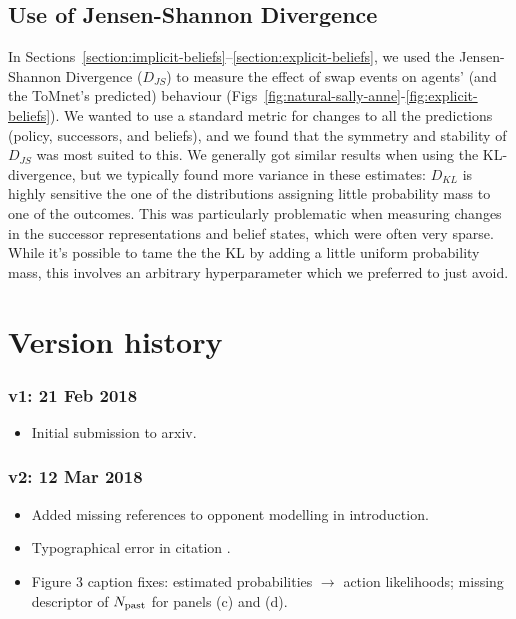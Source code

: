 \documentclass{article}
\begin{document}
\subsection{Use of Jensen-Shannon Divergence}
\label{appendix:notes:JS}

In Sections~\ref{section:implicit-beliefs}--\ref{section:explicit-beliefs}, we used the Jensen-Shannon Divergence ($D_{JS}$) to measure the effect of swap events on agents' (and the ToMnet's predicted) behaviour (Figs~\ref{fig:natural-sally-anne}-\ref{fig:explicit-beliefs}). We wanted to use a standard metric for changes to all the predictions (policy, successors, and beliefs), and we found that the symmetry and stability of $D_{JS}$ was most suited to this. We generally got similar results when using the KL-divergence, but we typically found more variance in these estimates: $D_{KL}$ is highly sensitive the one of the distributions assigning little probability mass to one of the outcomes. This was particularly problematic when measuring changes in the successor representations and belief states, which were often very sparse. While it's possible to tame the the KL by adding a little uniform probability mass, this involves an arbitrary hyperparameter which we preferred to just avoid. 


\section{Version history}
\label{appendix:version:history}


\subsubsection*{v1: 21 Feb 2018}

\begin{itemize}
	\item Initial submission to arxiv.
\end{itemize}


\subsubsection*{v2: 12 Mar 2018}

\begin{itemize}
	\item Added missing references to opponent modelling in introduction.
	\item Typographical error in citation \cite{dayan1993improving}.
	\item Figure 3 caption fixes: estimated probabilities $\rightarrow$ action likelihoods; missing descriptor of $N_{\mathrm{past}}$ for panels (c) and (d).
\end{itemize}
\end{document}
